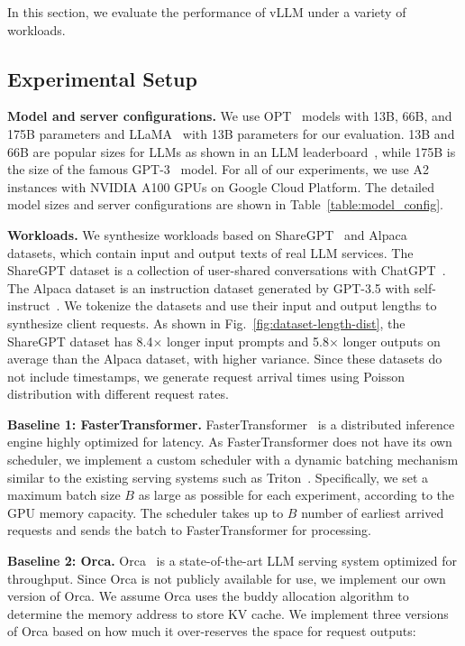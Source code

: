 In this section, we evaluate the performance of vLLM under a variety of workloads.

\subsection{Experimental Setup}
\label{subsec:exp-setup}

\textbf{Model and server configurations.} We use OPT~\cite{zhang2022opt} models with 13B, 66B, and 175B parameters and LLaMA~\cite{touvron2023llama} with 13B parameters for our evaluation. 13B and 66B are popular sizes for LLMs as shown in an LLM leaderboard~\cite{lmsysweek8}, while 175B is the size of the famous GPT-3~\cite{brown2020language} model. For all of our experiments, we use A2 instances with NVIDIA A100 GPUs on Google Cloud Platform. The detailed model sizes and server configurations are shown in Table~\ref{table:model_config}.

\textbf{Workloads.}
We synthesize workloads based on ShareGPT~\cite{sharegpt} and Alpaca~\cite{alpaca} datasets, which contain input and output texts of real LLM services. The ShareGPT dataset is a collection of user-shared conversations with ChatGPT~\cite{chatgpt}. The Alpaca dataset is an instruction dataset generated by GPT-3.5 with self-instruct~\cite{wang2022self}. We tokenize the datasets and use their input and output lengths to synthesize client requests. As shown in Fig.~\ref{fig:dataset-length-dist}, the ShareGPT dataset has 8.4$\times$ longer input prompts and 5.8$\times$ longer outputs on average than the Alpaca dataset, with higher variance. Since these datasets do not include timestamps, we generate request arrival times using Poisson distribution with different request rates.

\textbf{Baseline 1: FasterTransformer.} FasterTransformer~\cite{nvidiaft} is a distributed inference engine highly optimized for latency. As FasterTransformer does not have its own scheduler, we implement a custom scheduler with a dynamic batching mechanism similar to the existing serving systems such as Triton~\cite{nvidiatriton}. Specifically, we set a maximum batch size $B$ as large as possible for each experiment, according to the GPU memory capacity. The scheduler takes up to $B$ number of earliest arrived requests and sends the batch to FasterTransformer for processing.

\textbf{Baseline 2: Orca.} Orca~\cite{yu2022orca} is a state-of-the-art LLM serving system optimized for throughput. Since Orca is not publicly available for use, we implement our own version of Orca. We assume Orca uses the buddy allocation algorithm to determine the memory address to store KV cache. We implement three versions of Orca based on how much it over-reserves the space for request outputs:


